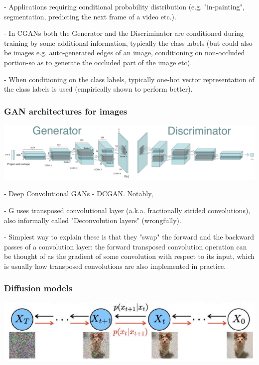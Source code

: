 - Applications requiring conditional probability distribution (e.g. "in-painting", segmentation, predicting the next frame of a video etc.).

- In CGANs both the Generator and the Discriminator are conditioned during training by some additional information, typically the class labels (but could also be images e.g. auto-generated edges of an image, conditioning on non-occluded portion-so as to generate the occluded part of the image etc).

- When conditioning on the class labels, typically one-hot vector representation of the class labels is used (empirically shown to perform better).

\subsubsection*{GAN architectures for images}

\includegraphics*[width=1\columnwidth]{figures/generative_GAN_architecture.png}

- Deep Convolutional GANs - DCGAN. Notably, 

- G uses transposed convolutional layer (a.k.a. fractionally strided convolutions), also informally called "Deconvolution layers" (wrongfully). 

- Simplest way to explain these is that they "swap" the forward and the backward passes of a convolution layer: the forward transposed convolution operation can be thought of as the gradient of some convolution with respect to its input, which is usually how transposed convolutions are also implemented in practice.


\subsubsection*{Diffusion models}

\includegraphics*[width=1\columnwidth]{figures/generative_diffusion.jpg}

